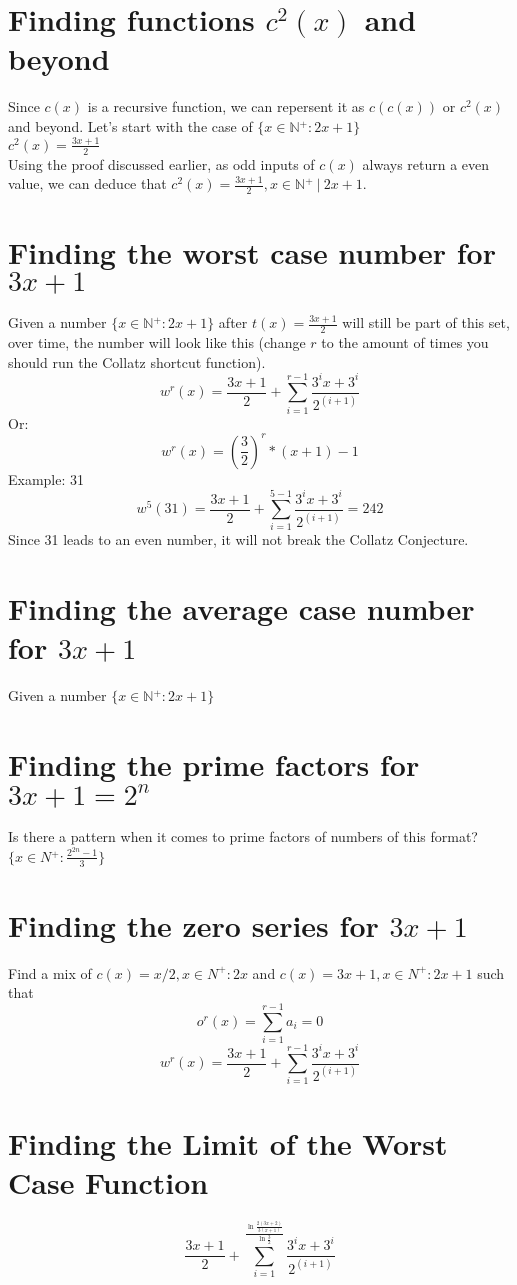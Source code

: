 \documentclass[a4paper,10pt]{article}
\begin{document}
  \section{Finding functions $c{^2}(x)$ and beyond}
  Since $c(x)$ is a recursive function, we can repersent it as $c(c(x))$ or $c{^2}(x)$ and beyond.
  Let's start with the case of \(\{x \in \mathbb{N{^+}} : 2x+1\}\) \\
  \(c^2(x) = \frac{3x+1}{2}\) \\
  Using the proof discussed earlier, as odd inputs of \(c(x)\) always return a even value, we can deduce that \(c^2(x) = \frac{3x+1}{2}, x \in \mathbb{N{^+}} \ | \ 2x+1\).
  \section{Finding the worst case number for $3x+1$}
  Given a number \(\{x \in \mathbb{N{^+}}: 2x + 1\}\) after \(t(x) = \frac{3x+1}{2}\) will still be part of this set, over time, the number will look like this (change $r$ to the amount of times you should run the Collatz shortcut function).
  \[
    w^{r}(x) = \frac{3x+1}{2}+\sum_{i=1}^{r-1} \frac{3^{i}x+3^{i}}{2^{(i+1)}}
  \]
  Or:
  \[
    w^{r}(x) = \left(\frac{3}{2}\right)^{r}*(x+1)-1
  \]
  Example: 31
  \[
     w^{5}(31) = \frac{3x+1}{2}+\sum_{i=1}^{5-1} \frac{3^{i}x+3^{i}}{2^{(i+1)}} = 242
  \]
  Since 31 leads to an even number, it will not break the Collatz Conjecture.
  \section{Finding the average case number for $3x+1$}
  Given a number \(\{x \in \mathbb{N{^+}}: 2x + 1\}\)
  \section{Finding the prime factors  for $3x+1=2^n$}
  Is there a pattern when it comes to prime factors of numbers of this format?
  \(\{x \in N{^+} : \frac{2^{2n}-1}{3}\}\)
  \section{Finding the zero series for $3x+1$}
  Find a mix of $c(x) = x/2, x \in N^{+} : 2x$ and $c(x) = 3x+1, x \in N^{+} : 2x + 1$ such that
  \[o^{r}(x) = \sum_{i=1}^{r-1} a_i = 0\]
  \[w^{r}(x) = \frac{3x+1}{2}+\sum_{i=1}^{r-1} \frac{3^{i}x+3^{i}}{2^{(i+1)}}\]
  \section{Finding the Limit of the Worst Case Function}
  \[
    \frac{3x+1}{2}+\sum_{i=1}^{\frac{\ln{\frac{2(3x+2)}{3(x+1)}}}{\ln{\frac{3}{2}}}} \frac{3^{i}x+3^{i}}{2^{(i+1)}}
  \]
\end{document}
